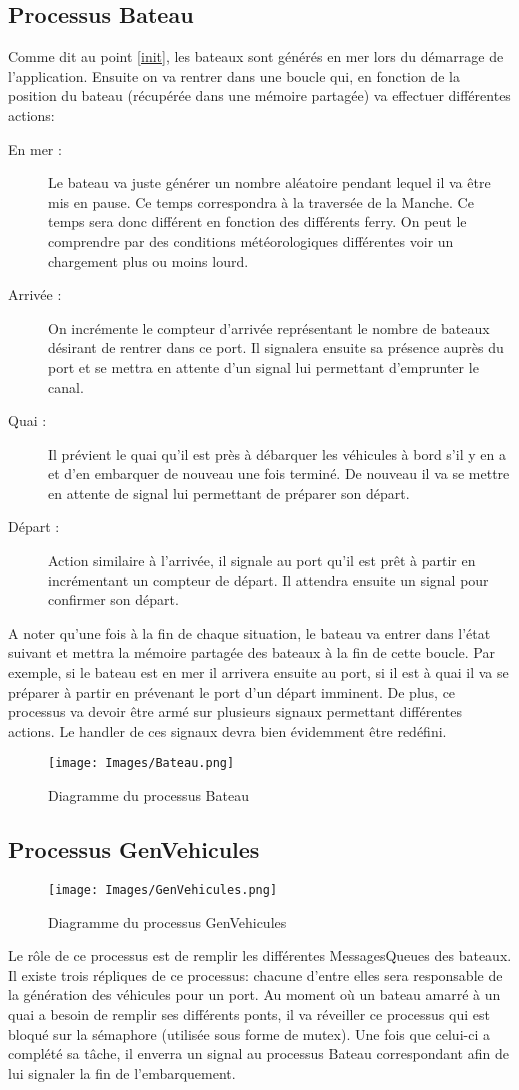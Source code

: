 \documentclass[a4paper, 11pt]{article}
\begin{document}
	\subsection{Processus Bateau}
		Comme dit au point \ref{init}, les bateaux sont générés en mer lors du démarrage de l'application. Ensuite on va rentrer dans une boucle qui, en fonction de la position du bateau (récupérée dans une mémoire partagée) va effectuer différentes actions:
		\begin{description}
			\item[En mer :] Le bateau va juste générer un nombre aléatoire pendant lequel il va être mis en pause. Ce temps correspondra à la traversée de la Manche. Ce temps sera donc différent en fonction des différents ferry. On peut le comprendre par des conditions météorologiques différentes voir un chargement plus ou moins lourd.
			\item[Arrivée :] On incrémente le compteur d'arrivée représentant le nombre de bateaux désirant de rentrer dans ce port. Il signalera ensuite sa présence auprès du port et se mettra en attente d'un signal lui permettant d'emprunter le canal.
			\item[Quai :] Il prévient le quai qu'il est près à débarquer les véhicules à bord s'il y en a et d'en embarquer de nouveau une fois terminé. De nouveau il va se mettre en attente de signal lui permettant de préparer son départ.
			\item[Départ :] Action similaire à l'arrivée, il signale au port qu'il est prêt à partir en incrémentant un compteur de départ. Il attendra ensuite un signal pour confirmer son départ.
		\end{description}
		A noter qu'une fois à la fin de chaque situation, le bateau va entrer dans l'état suivant et mettra la mémoire partagée des bateaux à la fin de cette boucle. Par exemple, si le bateau est en mer il arrivera ensuite au port, si il est à quai il va se préparer à partir en prévenant le port d'un départ imminent. De plus, ce processus va devoir être armé sur plusieurs signaux permettant différentes actions. Le handler de ces signaux devra bien évidemment être redéfini.
		\begin{figure}[!h]
			\centering
			\texttt{[image: Images/Bateau.png]}
			\caption{Diagramme du processus Bateau}
		\end{figure}
\newpage
	\subsection{Processus GenVehicules}
		\begin{figure}[!h]
			\centering
			\texttt{[image: Images/GenVehicules.png]}
			\caption{Diagramme du processus GenVehicules}
		\end{figure}
		Le rôle de ce processus est de remplir les différentes MessagesQueues des bateaux. Il existe trois répliques de ce processus: chacune d'entre elles sera responsable de la génération des véhicules pour un port. Au moment où un bateau amarré à un quai a besoin de remplir ses différents ponts, il va réveiller ce processus qui est bloqué sur la sémaphore (utilisée sous forme de mutex). Une fois que celui-ci a complété sa tâche, il enverra un signal au processus Bateau correspondant afin de lui signaler la fin de l'embarquement.
\end{document}
